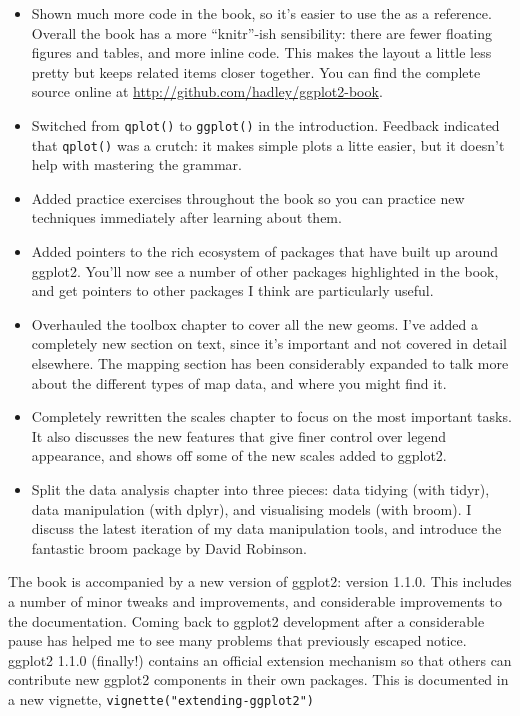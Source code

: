 \begin{itemize}
\item
  Shown much more code in the book, so it's easier to use the as a
  reference. Overall the book has a more ``knitr''-ish sensibility:
  there are fewer floating figures and tables, and more inline code.
  This makes the layout a little less pretty but keeps related items
  closer together. You can find the complete source online at
  \url{http://github.com/hadley/ggplot2-book}.
\item
  Switched from \texttt{qplot()} to \texttt{ggplot()} in the
  introduction. Feedback indicated that \texttt{qplot()} was a crutch:
  it makes simple plots a litte easier, but it doesn't help with
  mastering the grammar.
\item
  Added practice exercises throughout the book so you can practice new
  techniques immediately after learning about them.
\item
  Added pointers to the rich ecosystem of packages that have built up
  around ggplot2. You'll now see a number of other packages highlighted
  in the book, and get pointers to other packages I think are
  particularly useful.
\item
  Overhauled the toolbox chapter to cover all the new geoms. I've added
  a completely new section on text, since it's important and not covered
  in detail elsewhere. The mapping section has been considerably
  expanded to talk more about the different types of map data, and where
  you might find it.
\item
  Completely rewritten the scales chapter to focus on the most important
  tasks. It also discusses the new features that give finer control over
  legend appearance, and shows off some of the new scales added to
  ggplot2.
\item
  Split the data analysis chapter into three pieces: data tidying (with
  tidyr), data manipulation (with dplyr), and visualising models (with
  broom). I discuss the latest iteration of my data manipulation tools,
  and introduce the fantastic broom package by David Robinson.
\end{itemize}

The book is accompanied by a new version of ggplot2: version 1.1.0. This
includes a number of minor tweaks and improvements, and considerable
improvements to the documentation. Coming back to ggplot2 development
after a considerable pause has helped me to see many problems that
previously escaped notice. ggplot2 1.1.0 (finally!) contains an official
extension mechanism so that others can contribute new ggplot2 components
in their own packages. This is documented in a new vignette,
\texttt{vignette("extending-ggplot2")}

